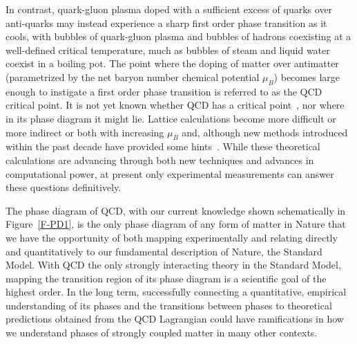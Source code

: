 %
In contrast, quark-gluon plasma doped with a sufficient excess of
quarks over anti-quarks may instead experience a sharp first order
phase transition as it cools, with bubbles of quark-gluon plasma and
bubbles of hadrons coexisting at a well-defined critical temperature,
much as bubbles of steam and liquid water coexist in a boiling
pot. The point where the doping of matter over antimatter
(parametrized by the net baryon number chemical potential $\mu_B$)
becomes large enough to instigate a first order phase transition is
referred to as the QCD critical point. It is not yet known whether QCD
has a critical point~\cite{Stephanov:1998dy,Fodor:2004nz,Allton:2005gk,Gavai:2008zr,deForcrand:2008zi},
nor where in its phase diagram it might lie. Lattice calculations
become more difficult or more indirect or both with increasing $\mu_B$
and, although new methods introduced within the past decade have
provided some hints~\cite{Fodor:2004nz,Gavai:2008zr,Datta:2012pj}.
While these theoretical calculations are advancing through both
new techniques and advances in computational power,
at present only experimental measurements can answer these questions
definitively. 


The phase diagram of QCD, with our current knowledge shown schematically
in Figure~\ref{F-PD1}, is the only phase diagram of any form of
matter in Nature that we have the opportunity of both mapping experimentally
and relating directly and quantitatively to our fundamental
description of Nature, the Standard Model. With QCD the only strongly
interacting theory in the Standard Model, mapping the transition
region of its phase diagram is a scientific goal of the highest
order. In the long term, successfully connecting a quantitative,
empirical understanding of its phases and the transitions between
phases to theoretical predictions obtained from the QCD Lagrangian
could have ramifications in how we understand phases of strongly
coupled matter in many other contexts.

